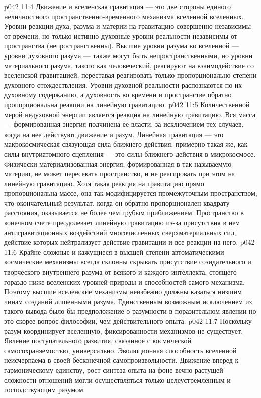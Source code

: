 \vs p042 11:4 \pc Движение и вселенская гравитация --- это две стороны единого неличностного пространственно\hyp{}временного механизма вселенной вселенных. Уровни реакции духа, разума и материи на гравитацию совершенно независимы от времени, но только истинно духовные уровни реальности независимы от пространства (непространственны). Высшие уровни разума во вселенной --- уровни духовного разума --- также могут быть непространственными, но уровни материального разума, такого как человеческий, реагируют на взаимодействие со вселенской гравитацией, переставая реагировать только пропорционально степени духовного отождествления. Уровни духовной реальности распознаются по их духовному содержанию, а духовность во времени и пространстве обратно пропорциональна реакции на линейную гравитацию.
\vs p042 11:5 Количественной мерой недуховной энергии является реакция на линейную гравитацию. Вся масса --- формированная энергия подчинена ее власти, за исключением тех случаев, когда на нее действуют движение и разум. Линейная гравитация --- это макрокосмическая связующая сила ближнего действия, примерно такая же, как силы внутриатомного сцепления --- это силы ближнего действия в микрокосмосе. Физически материализованная энергия, формированная в так называемую материю, не может пересекать пространство, и не реагировать при этом на линейную гравитацию. Хотя такая реакция на гравитацию прямо пропорциональна массе, она так модифицируется промежуточным пространством, что окончательный результат, когда он обратно пропорционален квадрату расстояния, оказывается не более чем грубым приближением. Пространство в конечном счете преодолевает линейную гравитацию из\hyp{}за присутствия в нем антигравитационных воздействий многочисленных сверхматериальных сил, действие которых нейтрализует действие гравитации и все реакции на него.
\vs p042 11:6 \pc Крайне сложные и кажущиеся в высшей степени автоматическими космические механизмы всегда склонны скрывать присутствие созидательного и творческого внутреннего разума от всякого и каждого интеллекта, стоящего гораздо ниже вселенских уровней природы и способностей самого механизма. Поэтому высшие вселенские механизмы неизбежно должны казаться низшим чинам созданий лишенными разума. Единственным возможным исключением из такого вывода было бы предположение о разумности в поразительном явлении  но это скорее вопрос философии, чем действительного опыта.
\vs p042 11:7 Поскольку разум координирует вселенную, фиксированности механизмов не существует. Явление поступательного развития, связанное с космической самосохраняемостью, универсально. Эволюционная способность вселенной неисчерпаема в своей бесконечной самопроизвольности. Движение вперед к гармоническому единству, рост синтеза опыта на фоне вечно растущей сложности отношений могли осуществляться только целеустремленным и господствующим разумом
